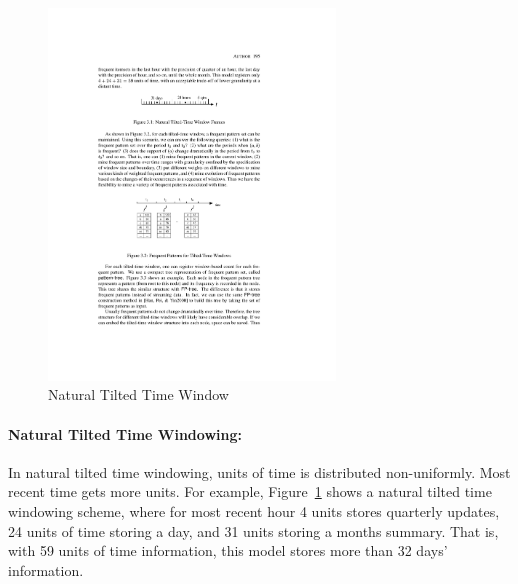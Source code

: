 \documentclass[a4paper, 11pt, oneside]{book}
\begin{document}
\begin{figure}[htbp]
    \begin{center}
        \includegraphics[width=3.0in]{figs/naturaltime.pdf}
        \caption{Natural Tilted Time Window}
        \label{fig:bg:ntime}
    \end{center}
\end{figure}
\paragraph{Natural Tilted Time Windowing:} In natural tilted time windowing, units of time is distributed non-uniformly. Most recent time gets more units. For example, Figure~\ref{fig:bg:ntime} shows a natural tilted time windowing scheme, where for most recent hour 4 units stores quarterly updates, 24 units of time storing a day, and 31 units storing a months summary. That is, with 59 units of time information, this model stores more than 32 days' information.
\end{document}
